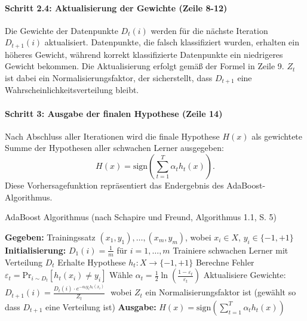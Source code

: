 \paragraph{Schritt 2.4: Aktualisierung der Gewichte (Zeile 8-12)}
\label{para:ada_algo_s2.4}
Die Gewichte der Datenpunkte \( D_t(i) \) werden für die nächste Iteration \( D_{t+1}(i) \) aktualisiert. Datenpunkte, die falsch klassifiziert wurden, erhalten ein höheres Gewicht, während korrekt klassifizierte Datenpunkte ein niedrigeres Gewicht bekommen. Die Aktualisierung erfolgt gemäß der Formel in Zeile 9. \( Z_t \) ist dabei ein Normalisierungsfaktor, der sicherstellt, dass \( D_{t+1} \) eine Wahrscheinlichkeitsverteilung bleibt.

\paragraph{Schritt 3: Ausgabe der finalen Hypothese (Zeile 14)}
\label{para:ada_algo_s3}
Nach Abschluss aller Iterationen wird die finale Hypothese \( H(x) \) als gewichtete Summe der Hypothesen aller schwachen Lerner ausgegeben:
\[
H(x) = \text{sign}\left(\sum_{t=1}^{T} \alpha_t h_t(x)\right).
\]
Diese Vorhersagefunktion repräsentiert das Endergebnis des AdaBoost-Algorithmus.

\begin{algorithm}[H]
    \caption[AdaBoost Algorithmus]{AdaBoost Algorithmus (nach Schapire und Freund, Algorithmus 1.1, S. 5)}\label{algo:adaboost}
    \begin{algorithmic}[1]
    \State \textbf{Gegeben:} Trainingssatz \( (x_1,y_1), \dots, (x_m,y_m) \), wobei \( x_i \in X \), \( y_i \in \{-1, +1\} \)
    \State \textbf{Initialisierung:} \( D_1(i) = \frac{1}{m} \) für \( i = 1, \dots, m \)
        \State Trainiere schwachen Lerner mit Verteilung \( D_t \)
        \State Erhalte Hypothese \( h_t : X \rightarrow \{-1, +1\} \)
        \State Berechne Fehler \( \varepsilon_t = \text{Pr}_{i \sim D_t} [h_t(x_i) \neq y_i] \)
        \State Wähle \( \alpha_t = \frac{1}{2} \ln\left(\frac{1 - \varepsilon_t}{\varepsilon_t}\right) \)
        \State Aktualisiere Gewichte: 
            \State \hfill \( D_{t+1}(i) = \frac{D_t(i) \cdot e^{-\alpha_t y_i h_t(x_i)}}{Z_t} \) \hfill\(\) %
        \EndFor
        \State wobei \( Z_t \) ein Normalisierungsfaktor ist (gewählt so dass \( D_{t+1} \) eine Verteilung ist)
    \EndFor
    \State \textbf{Ausgabe:} \( H(x) = \text{sign}\left(\sum_{t=1}^{T} \alpha_t h_t(x)\right) \)
    \end{algorithmic}
\end{algorithm}

